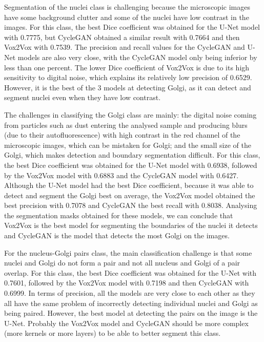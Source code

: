 Segmentation of the nuclei class is challenging because the microscopic images have some background clutter and some of the nuclei have low contrast in the images. For this class, the best Dice coefficient was obtained for the U-Net model with 0.7775, but CycleGAN obtained a similar result with 0.7664 and then Vox2Vox with 0.7539. The precision and recall values for the CycleGAN and U-Net models are also very close, with the CycleGAN model only being inferior by less than one percent. The lower Dice coefficient of Vox2Vox is due to its high sensitivity to digital noise, which explains its relatively low precision of 0.6529. However, it is the best of the 3 models at detecting Golgi, as it can detect and segment nuclei even when they have low contrast.

The challenges in classifying the Golgi class are mainly: the digital noise coming from particles such as dust entering the analysed sample and producing blurs (due to their autofluorescence) with high contrast in the red channel of the microscopic images, which can be mistaken for Golgi; and the small size of the Golgi, which makes detection and boundary segmentation difficult. For this class, the best Dice coefficient was obtained for the U-Net model with 0.6938, followed by the Vox2Vox model with 0.6883 and the CycleGAN model with 0.6427. Although the U-Net model had the best Dice coefficient, because it was able to detect and segment the Golgi best on average, the Vox2Vox model obtained the best precision with 0.7078 and CycleGAN the best recall with 0.8038. Analysing the segmentation masks obtained for these models, we can conclude that Vox2Vox is the best model for segmenting the boundaries of the nuclei it detects and CycleGAN is the model that detects the most Golgi on the images.

For the nucleus-Golgi pairs class, the main classification challenge is that some nuclei and Golgi do not form a pair and not all nucleus and Golgi of a pair overlap. For this class, the best Dice coefficient was obtained for the U-Net with 0.7601, followed by the Vox2Vox model with 0.7198 and then CycleGAN with 0.6999. In terms of precision, all the models are very close to each other as they all have the same problem of incorrectly detecting individual nuclei and Golgi as being paired. However, the best model at detecting the pairs on the image is the U-Net. Probably the Vox2Vox model and CycleGAN should be more complex (more kernels or more layers) to be able to better segment this class.

